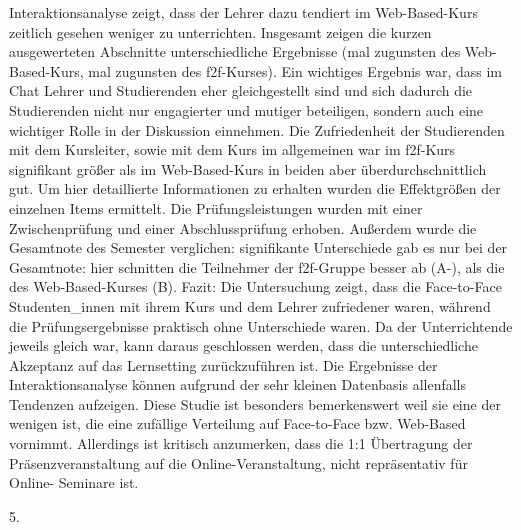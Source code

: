 Interaktionsanalyse zeigt, dass der Lehrer dazu tendiert im
Web-Based-Kurs zeitlich gesehen weniger zu unterrichten. Insgesamt
zeigen die kurzen ausgewerteten Abschnitte unterschiedliche Ergebnisse
(mal zugunsten des Web-Based-Kurs, mal zugunsten des f2f-Kurses). Ein
wichtiges Ergebnis war, dass im Chat Lehrer und Studierenden eher
gleichgestellt sind und sich dadurch die Studierenden nicht nur
engagierter und mutiger beteiligen, sondern auch eine wichtiger Rolle in
der Diskussion einnehmen. Die Zufriedenheit der Studierenden mit dem
Kursleiter, sowie mit dem Kurs im allgemeinen war im f2f-Kurs
signifikant größer als im Web-Based-Kurs in beiden aber
überdurchschnittlich gut. Um hier detaillierte Informationen zu erhalten
wurden die Effektgrößen der einzelnen Items ermittelt. Die
Prüfungsleistungen wurden mit einer Zwischenprüfung und einer
Abschlussprüfung erhoben. Außerdem wurde die Gesamtnote des Semester
verglichen: signifikante Unterschiede gab es nur bei der Gesamtnote:
hier schnitten die Teilnehmer der f2f-Gruppe besser ab (A-), als die des
Web-Based-Kurses (B). Fazit: Die Untersuchung zeigt, dass die
Face-to-Face Studenten\_innen mit ihrem Kurs und dem Lehrer zufriedener
waren, während die Prüfungsergebnisse praktisch ohne Unterschiede waren.
Da der Unterrichtende jeweils gleich war, kann daraus geschlossen
werden, dass die unterschiedliche Akzeptanz auf das Lernsetting
zurückzuführen ist. Die Ergebnisse der Interaktionsanalyse können
aufgrund der sehr kleinen Datenbasis allenfalls Tendenzen aufzeigen.
Diese Studie ist besonders bemerkenswert weil sie eine der wenigen ist,
die eine zufällige Verteilung auf Face-to-Face bzw. Web-Based vornimmt.
Allerdings ist kritisch anzumerken, dass die 1:1 Übertragung der
Präsenzveranstaltung auf die Online-Veranstaltung, nicht repräsentativ
für Online- Seminare ist.

5.

